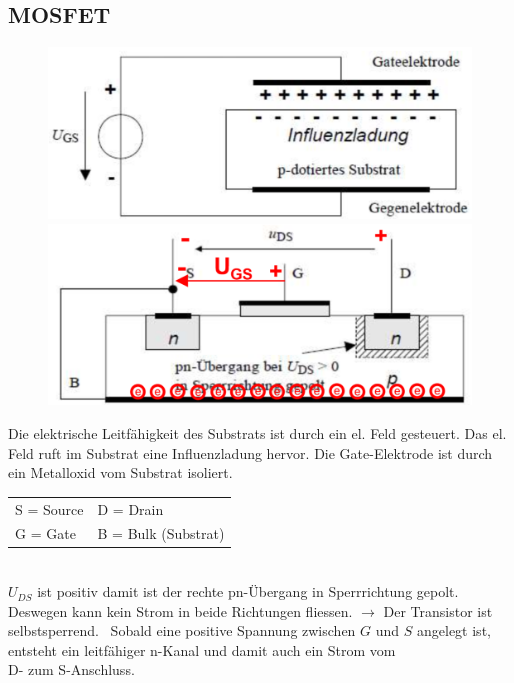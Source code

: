 \subsection{MOSFET}
\begin{figure}
    \vspace{-1cm}
    \includegraphics[width=\linewidth]{images/mosfetprinz}
    \newline
    \includegraphics[width=\linewidth]{images/mosfetprak}
\end{figure}
Die elektrische Leitfähigkeit des Substrats ist durch ein el. Feld \mbox{gesteuert}. Das el. Feld ruft im Substrat eine Influenzladung hervor.\newline
Die Gate-Elektrode ist durch ein Metalloxid vom Substrat isoliert.\\[0.3cm]
\begin{tabular}{ll}
    S = Source & D = Drain\\
    G = Gate & B = Bulk (Substrat)\\
\end{tabular}\\[0.3cm]
$ U_{DS} $ ist positiv damit ist der rechte pn-Übergang in Sperrrichtung \mbox{gepolt}. Deswegen kann kein Strom in beide Richtungen fliessen.\newline
$ \rightarrow $ Der Transistor ist selbstsperrend.\newline
\danger~Sobald eine positive Spannung zwischen $ G $ und $ S $ angelegt ist, entsteht ein leitfähiger n-Kanal und damit auch ein Strom vom \\D- zum S-Anschluss.
 \vspace{-0.2cm}
